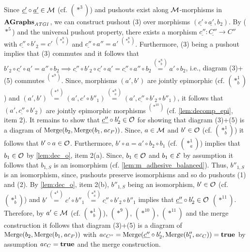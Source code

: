 \begin{description}
\begin{description}
Since $\underline{c'} \circ \underline{a'} \in {\cal M}$ (cf. $(*^3)$) and pushouts exist along ${\cal M}$-morphisms in $\mathbf{AGraphs}_\mathit{ATGI}$, we can construct pushout (3) over morphisms $(\underline{c'} \circ \underline{a'},b_2)$.
By ($*^5$) and the universal pushout property, there exists a morphism $\underline{c''}\colon \underline{C''} \to C''$ with $\underline{c''} \circ b'_2=c'$ $^{(*^8_a)}$ and $\underline{c''} \circ a''=a'$ $^{(*^8_b)}$.
Furthermore, (3) being a pushout implies that (3) commutes and it follows that $b'_2 \circ \underline{c'} \circ \underline{a'}=a'' \circ b_2 \implies \underline{c''} \circ b'_2 \circ \underline{c'} \circ \underline{a'}=\underline{c''} \circ a'' \circ b_2 \stackrel{(*^8_b)}{=}a' \circ b_2$, i.e., diagram (3)+(5) commutes $^{(*^9)}$.
Since, morphisms $(a',b')$ are jointly epimorphic (cf. $(*^1_b)$) and $(a',b')\stackrel{(*^4)}{=}(a',c' \circ b''_1)\stackrel{(*^8_a)}{=}(a',\underline{c''} \circ b'_2 \circ b''_1)$, it follows that $(a', \underline{c''} \circ b'_2)$ are jointly epimorphic morphisms $^{(*^{10})}$ (cf. \cref{lem:decomp_epi}, item 2).
It remains to show that $\underline{c''} \circ b'_2 \in {\cal O}$ for showing that diagram (3)+(5) is a diagram of $\mathrm{Merge}(b_2,\mathrm{Merge}(b_1,\mathit{ac}_P))$.
Since, $a \in {\cal M}$ and $b' \in {\cal O}$ (cf. $(*^1_b)$) it follows that $b' \circ a \in {\cal O}$.
Furthermore, $b' \circ a=a' \circ b_2 \circ b_1$ (cf. $(*^1_a)$) implies that $b_1 \in {\cal O}$ by \cref{lem:dec_o}, item 2(a).
Since, $b_1 \in {\cal O}$ and $b_1 \in \mathcal{E}$ by assumption it follows that $b_{1,S}$ is an isomorphism (cf. \cref{lem:m_adhesive_balanced}).
Thus, $b''_{1,S}$ is an isomorphism, since, pushouts preserve isomorphisms and so do pushouts (1) and (2).
By \cref{lem:dec_o}, item 2(b), $b''_{1,S}$ being an isomorphism, $b' \in {\cal O}$ (cf. $(*^1_b)$) and $b' \stackrel{(*^4)}{=} c' \circ b''_1 \stackrel{(*^8_a)}{=} \underline{c''} \circ b'_2 \circ b''_1$ implies that $\underline{c''} \circ b'_2 \in {\cal O}$ $(*^{11})$.
Therefore, by $a' \in {\cal M}$ (cf. $(*^1_b)$), $(*^9)$, $(*^{10})$, $(*^{11})$ and the merge construction it follows that diagram (3)+(5) is a diagram of $\mathrm{Merge}(b_2,\mathrm{Merge}(b_1,\mathit{ac}_P))$ with $\mathit{ac}_{C''}=\mathrm{Merge}(\underline{c''} \circ b'_2,\mathrm{Merge}(b''_1,\mathit{ac}_C))=\textbf{true}$ by assumption $\mathit{ac}_C=\textbf{true}$ and the merge construction.


\end{description}
\end{description}
